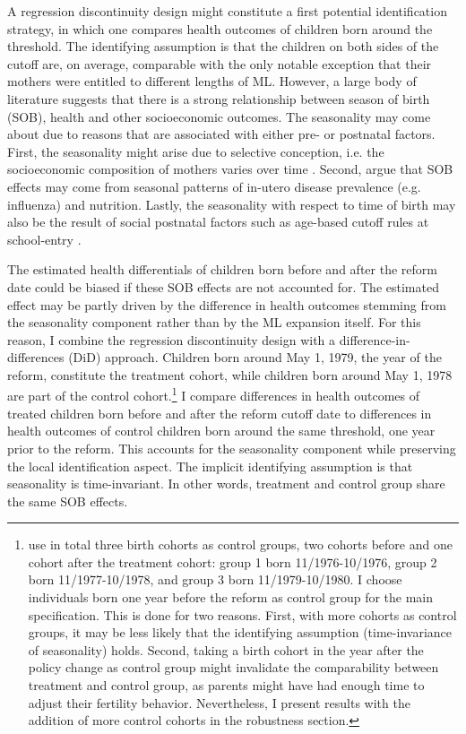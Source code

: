 A regression discontinuity design might constitute a first potential identification strategy, in which one compares health outcomes of children born around the threshold. The identifying assumption is that the children on both sides of the cutoff are, on average, comparable with the only notable exception that their mothers were entitled to different lengths of ML. However, a large body of literature suggests that there is a strong relationship between season of birth (SOB), health and other socioeconomic outcomes. The seasonality may come about due to reasons that are associated with either pre- or postnatal factors. First, the seasonality might arise due to selective conception, i.e. the socioeconomic composition of mothers varies over time \citep{buckles2013season}. Second, \cite{currie2013within} argue that SOB effects may come from seasonal patterns of in-utero disease prevalence (e.g. influenza) and nutrition. Lastly, the seasonality with respect to time of birth may also be the result of social postnatal factors such as age-based cutoff rules at school-entry \citep{black2011too}.


The estimated health differentials of children born before and after the reform date could be biased if these SOB effects are not accounted for. The estimated effect may be partly driven by the difference in health outcomes stemming from the seasonality component rather than by the ML expansion itself. For this reason, I combine the regression discontinuity design with a difference-in-differences (DiD) approach. Children born around May 1, 1979, the year of the reform, constitute the treatment cohort, while children born around May 1, 1978 are part of the control cohort.\footnote{\cite{Dustmann2012} use in total three birth cohorts as control groups, two cohorts before and one cohort after the treatment cohort: group 1 born 11/1976-10/1976, group 2 born 11/1977-10/1978, and group 3 born 11/1979-10/1980. I choose individuals born one year before the reform as control group for the main specification. This is done for two reasons. First, with more cohorts as control groups, it may be less likely that the identifying assumption (time-invariance of seasonality) holds. Second, taking a birth cohort in the year after the policy change as control group might invalidate the comparability between treatment and control group, as parents might have had enough time to adjust their fertility behavior. Nevertheless, I present results with the addition of more control cohorts in the robustness section.} I compare differences in health outcomes of treated children born before and after the reform cutoff date to differences in health outcomes of control children born around the same threshold, one year prior to the reform. This accounts for the seasonality component while preserving the local identification aspect. The implicit identifying assumption is that seasonality is time-invariant. In other words, treatment and control group share the same SOB effects.


